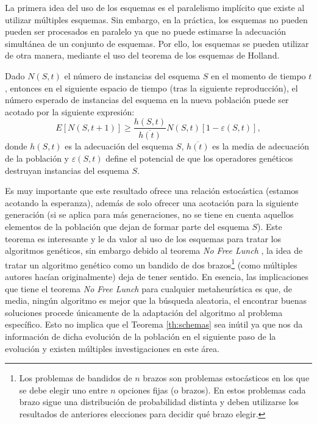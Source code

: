 La primera idea del uso de los esquemas es el paralelismo implícito que existe al utilizar múltiples esquemas. Sin embargo, en la práctica, los esquemas no pueden pueden ser procesados en paralelo ya que no puede estimarse la adecuación simultánea de un conjunto de esquemas. Por ello, los esquemas se pueden utilizar de otra manera, mediante el uso del teorema de los esquemas de Holland. 

\begin{theorem}\label{th:schemas}
    Dado $N(S,t)$ el número de instancias del esquema $S$ en el momento de tiempo $t$, entonces en el siguiente espacio de tiempo (tras la siguiente reproducción), el número esperado de instancias del esquema en la nueva población puede ser acotado por la siguiente expresión:
    \begin{equation*}
        E[N(S,t+1)]\geq\frac{h(S,t)}{\overline{h(t)}}N(S,t)[1- \varepsilon(S,t)],
    \end{equation*}
    donde $h(S,t)$ es la adecuación del esquema $S$, $\overline{h(t)}$ es la media de adecuación de la población y $\varepsilon(S,t)$ define el potencial de que los operadores genéticos destruyan instancias del esquema $S$.
\end{theorem}

Es muy importante que este resultado ofrece una relación estocástica (estamos acotando la esperanza), además de solo ofrecer una acotación para la siguiente generación (si se aplica para más generaciones, no se tiene en cuenta aquellos elementos de la población que dejan de formar parte del esquema $S$). Este teorema es interesante y le da valor al uso de los esquemas para tratar los algoritmos genéticos, sin embargo debido al teorema \textit{No Free Lunch} \cite{nflt}, la idea de tratar un algoritmo genético como un bandido de dos brazos\footnote{Los problemas de bandidos de $n$ brazos son problemas estocásticos en los que se debe elegir uno entre $n$ opciones fijas (o brazos). En estos problemas cada brazo sigue una distribución de probabilidad distinta y deben utilizarse los resultados de anteriores elecciones para decidir qué brazo elegir.} (como múltiples autores hacían originalmente) deja de tener sentido. En esencia, las implicaciones que tiene el teorema \textit{No Free Lunch} para cualquier metaheurística es que, de media, ningún algoritmo es mejor que la búsqueda aleatoria, el encontrar buenas soluciones procede únicamente de la adaptación del algoritmo al problema específico. Esto no implica que el Teorema \ref{th:schemas} sea inútil ya que nos da información de dicha evolución de la población en el siguiente paso de la evolución y existen múltiples investigaciones en este área.\\

